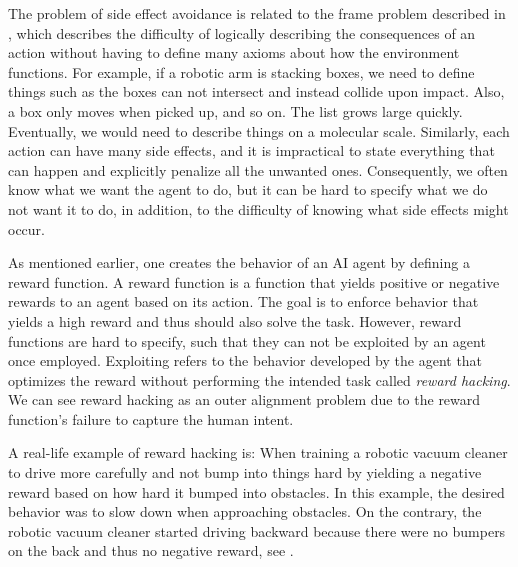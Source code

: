 \documentclass[12pt,A4]{report}
\theoremstyle{definition}
\begin{document}
The problem of side effect avoidance is related to the frame problem described in \citet{Mc69}, which describes the difficulty of logically describing the consequences of an action without having to define many axioms about how the environment functions. For example, if a robotic arm is stacking boxes, we need to define things such as the boxes can not intersect and instead collide upon impact. Also, a box only moves when picked up, and so on. The list grows large quickly. Eventually, we would need to describe things on a molecular scale. Similarly, each action can have many side effects, and it is impractical to state everything that can happen and explicitly penalize all the unwanted ones. Consequently, we often know what we want the agent to do, but it can be hard to specify what we do not want it to do, in addition, to the difficulty of knowing what side effects might occur.


As mentioned earlier, one creates the behavior of an AI agent by defining a reward function. A reward function is a function that yields positive or negative rewards to an agent based on its action. The goal is to enforce behavior that yields a high reward and thus should also solve the task. However, reward functions are hard to specify, such that they can not be exploited by an agent once employed. Exploiting refers to the behavior developed by the agent that optimizes the reward without performing the intended task called \textit{reward hacking}. We can see reward hacking as an outer alignment problem due to the reward function's failure to capture the human intent.

A real-life example of reward hacking is: When training a robotic vacuum cleaner to drive more carefully and not bump into things hard by yielding a negative reward based on how hard it bumped into obstacles. In this example, the desired behavior was to slow down when approaching obstacles. On the contrary, the robotic vacuum cleaner started driving backward because there were no bumpers on the back and thus no negative reward, see \citet{Smingleigh}. 
\end{document}
